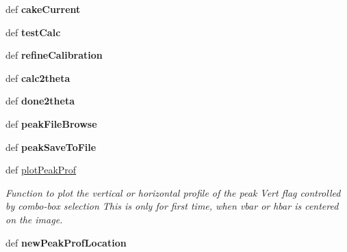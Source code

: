 \begin{DoxyCompactItemize}
\item 
\hypertarget{classAtrex_1_1Atrex_a4ed5b63695c617a40eb6fc2c50db7575}{def {\bfseries cake\-Current}}\label{classAtrex_1_1Atrex_a4ed5b63695c617a40eb6fc2c50db7575}

\item 
\hypertarget{classAtrex_1_1Atrex_aa1141a78fc819e7fd22a44e1847a89ba}{def {\bfseries test\-Calc}}\label{classAtrex_1_1Atrex_aa1141a78fc819e7fd22a44e1847a89ba}

\item 
\hypertarget{classAtrex_1_1Atrex_ac28031fab9314022a601532483a7b546}{def {\bfseries refine\-Calibration}}\label{classAtrex_1_1Atrex_ac28031fab9314022a601532483a7b546}

\item 
\hypertarget{classAtrex_1_1Atrex_aaa0ad76fcdcdde4e7138ade95031e6c7}{def {\bfseries calc2theta}}\label{classAtrex_1_1Atrex_aaa0ad76fcdcdde4e7138ade95031e6c7}

\item 
\hypertarget{classAtrex_1_1Atrex_ac75d2b26897d6d799773b27b41ea369b}{def {\bfseries done2theta}}\label{classAtrex_1_1Atrex_ac75d2b26897d6d799773b27b41ea369b}

\item 
\hypertarget{classAtrex_1_1Atrex_a4d6871d5055309cbbaddb62e00bfbea5}{def {\bfseries peak\-File\-Browse}}\label{classAtrex_1_1Atrex_a4d6871d5055309cbbaddb62e00bfbea5}

\item 
\hypertarget{classAtrex_1_1Atrex_aaa23b7529d44f3cbbeedfd8434c8bce9}{def {\bfseries peak\-Save\-To\-File}}\label{classAtrex_1_1Atrex_aaa23b7529d44f3cbbeedfd8434c8bce9}

\item 
\hypertarget{classAtrex_1_1Atrex_a3a5f2aee5b962e1615c54395d9edd172}{def \hyperlink{classAtrex_1_1Atrex_a3a5f2aee5b962e1615c54395d9edd172}{plot\-Peak\-Prof}}\label{classAtrex_1_1Atrex_a3a5f2aee5b962e1615c54395d9edd172}

\begin{DoxyCompactList}\small\item\em Function to plot the vertical or horizontal profile of the peak Vert flag controlled by combo-\/box selection This is only for first time, when vbar or hbar is centered on the image. \end{DoxyCompactList}\item 
\hypertarget{classAtrex_1_1Atrex_ad7997e5a735ce1b34d713a4b27490fbc}{def {\bfseries new\-Peak\-Prof\-Location}}\label{classAtrex_1_1Atrex_ad7997e5a735ce1b34d713a4b27490fbc}


\end{DoxyCompactItemize}
